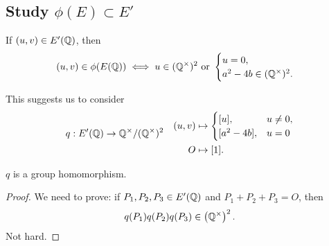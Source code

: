 \subsection*{Study \texorpdfstring{$\phi(E)\subset E'$}{phi(E)}}
\begin{lemma}
    If $(u, v)\in E'(\mathbb{Q})$,
    then \[(u, v)\in\phi(E(\mathbb{Q}))\iff u\in(\mathbb{Q}^\times)^2\text{ or }\begin{cases}
        u = 0, \\ a^2 - 4b\in (\mathbb{Q}^\times)^2.\qedhere
    \end{cases}\]
\end{lemma}

This suggests us to consider \[q : E'(\mathbb{Q})\to\mathbb{Q}^\times/(\mathbb{Q}^\times)^2\quad \begin{aligned}
    (u, v) &\mapsto\begin{cases}
        [u], & u\ne 0,\\ [a^2 - 4b], & u = 0
    \end{cases}\\
    O&\mapsto [1].
\end{aligned}\]

\begin{lemma}
    $q$ is a group homomorphism.
\end{lemma}
\begin{proof}
    We need to prove: if $P_1, P_2, P_3\in E'(\mathbb{Q})$ and $P_1 + P_2  + P_3 = O$,
    then \[q(P_1)q(P_2)q(P_3) \in \left( \mathbb{Q}^\times \right)^2.\]
    Not hard.
\end{proof}

